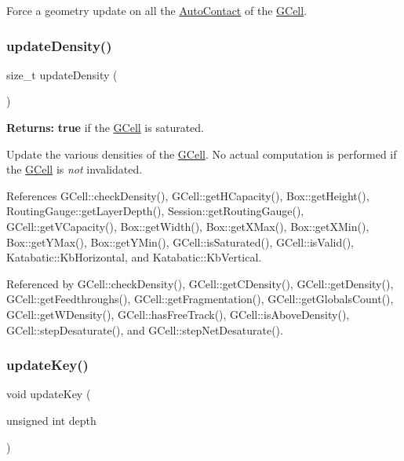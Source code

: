Force a geometry update on all the \mbox{\hyperlink{classKatabatic_1_1AutoContact}{Auto\+Contact}} of the \mbox{\hyperlink{classKatabatic_1_1GCell}{G\+Cell}}. \mbox{\label{classKatabatic_1_1GCell_a9b3455dce10eb98d0496175dd586528c}} 
\subsubsection{\texorpdfstring{update\+Density()}{updateDensity()}}
{\footnotesize\ttfamily size\+\_\+t update\+Density (\begin{DoxyParamCaption}{ }\end{DoxyParamCaption})}

{\bfseries Returns\+:} {\bfseries true} if the \mbox{\hyperlink{classKatabatic_1_1GCell}{G\+Cell}} is saturated.

Update the various densities of the \mbox{\hyperlink{classKatabatic_1_1GCell}{G\+Cell}}. No actual computation is performed if the \mbox{\hyperlink{classKatabatic_1_1GCell}{G\+Cell}} is {\itshape not} invalidated. 

References G\+Cell\+::check\+Density(), G\+Cell\+::get\+H\+Capacity(), Box\+::get\+Height(), Routing\+Gauge\+::get\+Layer\+Depth(), Session\+::get\+Routing\+Gauge(), G\+Cell\+::get\+V\+Capacity(), Box\+::get\+Width(), Box\+::get\+X\+Max(), Box\+::get\+X\+Min(), Box\+::get\+Y\+Max(), Box\+::get\+Y\+Min(), G\+Cell\+::is\+Saturated(), G\+Cell\+::is\+Valid(), Katabatic\+::\+Kb\+Horizontal, and Katabatic\+::\+Kb\+Vertical.



Referenced by G\+Cell\+::check\+Density(), G\+Cell\+::get\+C\+Density(), G\+Cell\+::get\+Density(), G\+Cell\+::get\+Feedthroughs(), G\+Cell\+::get\+Fragmentation(), G\+Cell\+::get\+Globals\+Count(), G\+Cell\+::get\+W\+Density(), G\+Cell\+::has\+Free\+Track(), G\+Cell\+::is\+Above\+Density(), G\+Cell\+::step\+Desaturate(), and G\+Cell\+::step\+Net\+Desaturate().

\mbox{\label{classKatabatic_1_1GCell_a11beff0f0bec06d0f3e080969516dfc3}} 
\subsubsection{\texorpdfstring{update\+Key()}{updateKey()}}
{\footnotesize\ttfamily void update\+Key (\begin{DoxyParamCaption}\item[{unsigned int}]{depth }\end{DoxyParamCaption})\hspace{0.3cm}{\ttfamily [inline]}}

